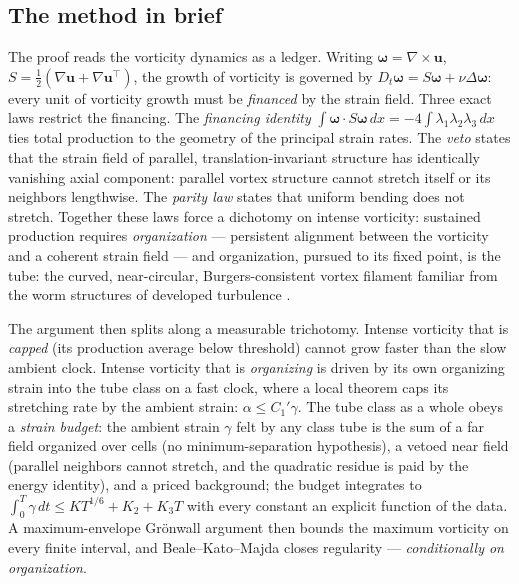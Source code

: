 \documentclass[11pt,letterpaper]{amsart}
\theoremstyle{definition}
\theoremstyle{remark}
\newcommand{\vort}{\boldsymbol{\omega}}
\newcommand{\uu}{\boldsymbol{u}}
\begin{document}
\subsection{The method in brief}\label{subsec:method}
The proof reads the vorticity dynamics as a ledger. Writing $\vort=\nabla\times\uu$,
$S=\tfrac12(\nabla\uu+\nabla\uu^{\top})$, the growth of vorticity is governed by
$D_t\vort=S\vort+\nu\Delta\vort$: every unit of vorticity growth must be
\emph{financed} by the strain field. Three exact laws restrict the financing. The
\emph{financing identity} $\int\vort\cdot S\vort\,dx=-4\int\lambda_1\lambda_2\lambda_3\,dx$
ties total production to the geometry of the principal strain rates. The \emph{veto}
states that the strain field of parallel, translation-invariant structure has
identically vanishing axial component: parallel vortex structure cannot stretch itself
or its neighbors lengthwise. The \emph{parity law} states that uniform bending does
not stretch. Together these laws force a dichotomy on intense vorticity: sustained
production requires \emph{organization} --- persistent alignment between the vorticity
and a coherent strain field --- and organization, pursued to its fixed point, is the
tube: the curved, near-circular, Burgers-consistent vortex filament familiar from the
worm structures of developed turbulence
\cite{JimenezWraySaffmanRogallo1993,MoffattKidaOhkitani1994}.

The argument then splits along a measurable trichotomy. Intense vorticity that is
\emph{capped} (its production average below threshold) cannot grow faster than the slow
ambient clock. Intense vorticity that is \emph{organizing} is driven by its own
organizing strain into the tube class on a fast clock, where a local theorem caps its
stretching rate by the ambient strain: $\alpha\le C_1'\gamma$. The tube class as a
whole obeys a \emph{strain budget}: the ambient strain $\gamma$ felt by any class tube
is the sum of a far field organized over cells (no minimum-separation hypothesis), a
vetoed near field (parallel neighbors cannot stretch, and the quadratic residue is
paid by the energy identity), and a priced background; the budget integrates to
$\int_0^T\gamma\,dt\le KT^{1/6}+K_2+K_3T$ with every constant an explicit function of
the data. A maximum-envelope Gr\"onwall argument then bounds the maximum vorticity on
every finite interval, and Beale--Kato--Majda \cite{BealeKatoMajda1984} closes
regularity --- \emph{conditionally on organization}.
\end{document}
